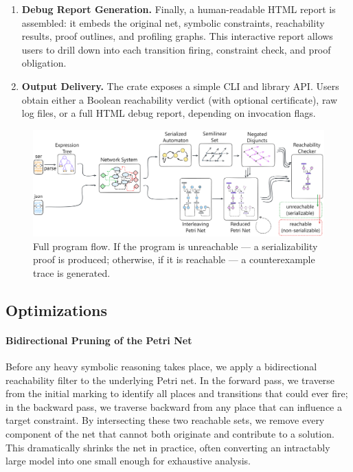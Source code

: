 \begin{enumerate}
	\item \textbf{Debug Report Generation.} Finally, a human-readable HTML report is assembled: it embeds the original net, symbolic constraints, reachability results, proof outlines, and profiling graphs. This interactive report allows users to drill down into each transition firing, constraint check, and proof obligation.
	
	\item \textbf{Output Delivery.} The crate exposes a simple CLI and library API. Users obtain either a Boolean reachability verdict (with optional certificate), raw log files, or a full HTML debug report, depending on invocation flags.
\end{enumerate}



\begin{figure}[htbp]
	\centering
	\includegraphics[width=1.0\textwidth]{plots/full_program_flow.pdf}
	\caption{Full program flow. If the program is unreachable --- a serializability proof is produced; otherwise, if it is reachable --- a counterexample trace is generated.}
	\label{fig:full_program_flow}
\end{figure}


\subsection{Optimizations}

\paragraph{Bidirectional Pruning of the Petri Net}
Before any heavy symbolic reasoning takes place, we apply a bidirectional reachability filter to the underlying Petri net.  In the forward pass, we traverse from the initial marking to identify all places and transitions that could ever fire; in the backward pass, we traverse backward from any place that can influence a target constraint.  By intersecting these two reachable sets, we remove every component of the net that cannot both originate and contribute to a solution.  This dramatically shrinks the net in practice, often converting an intractably large model into one small enough for exhaustive analysis.

